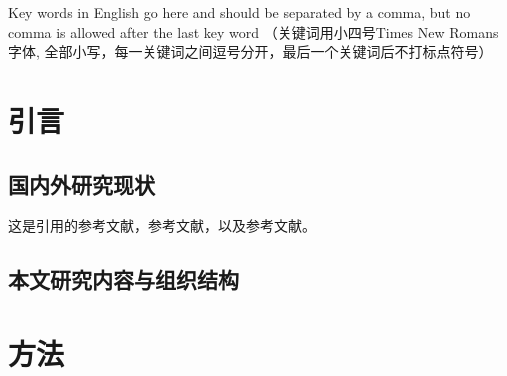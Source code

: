 \documentclass{ZUST_Thesis}
\begin{document}
Key words in English go here and should be separated by a comma, but no comma is allowed after the last key word （关键词用小四号Times New Romans字体, 全部小写，每一关键词之间逗号分开，最后一个关键词后不打标点符号） 





\newpage
\pagestyle{tabofcontent}
\tableofcontents



\newpage
\pagestyle{main}
\setcounter{page}{1}

\setlength\abovedisplayskip{0em}
\setlength\belowdisplayskip{0em}

\section{引言}


\subsection{国内外研究现状}


这是引用的参考文献\cite{CNN}，参考文献\cite{DNN,深度学习,西瓜书}，以及参考文献。



\subsection{本文研究内容与组织结构}








\section{方法}
\end{document}
